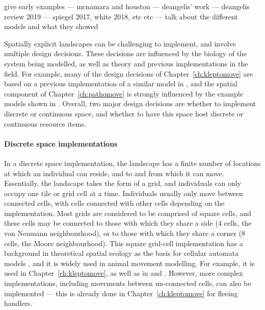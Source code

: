 give early examples --- mcnamara and houston --- deangelis' work --- deangelis review 2019 --- spiegel 2017, white 2018, etc etc --- talk about the different models and what they showed

Spatially explicit landscapes can be challenging to implement, and involve multiple design decisions.
These decisions are influenced by the biology of the system being modelled, as well as theory and previous implementations in the field.
For example, many of the design decisions of Chapter~\ref{ch:kleptomove} are based on a previous implementation of a similar model in \citet{netz2021a}, and the spatial component of Chapter~\ref{ch:pathomove} is strongly influenced by the example models shown in \citet{spiegel2017}.
Overall, two major design decisions are whether to implement discrete or continuous space, and whether to have this space host discrete or continuous resource items.

\paragraph*{Discrete space implementations}

In a discrete space implementation, the landscape has a finite number of locations at which an individual can reside, and to and from which it can move.
Essentially, the landscape takes the form of a grid, and individuals can only occupy one tile or grid cell at a time.
Individuals usually only move between connected cells, with cells connected with other cells depending on the implementation.
Most grids are considered to be comprised of square cells, and these cells may be connected to those with which they share a side (4 cells, the von Neumann neighbourhood), or to those with which they share a corner (8 cells, the Moore neighbourhood).
This square grid-cell implementation has a background in theoretical spatial ecology as the basis for cellular automata models \citep[even those concerned with animals][]{jeltschf.1997}, and it is widely used in animal movement modelling.
For example, it is used in Chapter~\ref{ch:kleptomove}, as well as in \citet{white2018,dinuzzo2020,scherer2020} and \citet{netz2021a}.
However, more complex implementations, including movements between un-connected cells, can also be implemented --- this is already done in Chapter~\ref{ch:kleptomove} for fleeing handlers.

